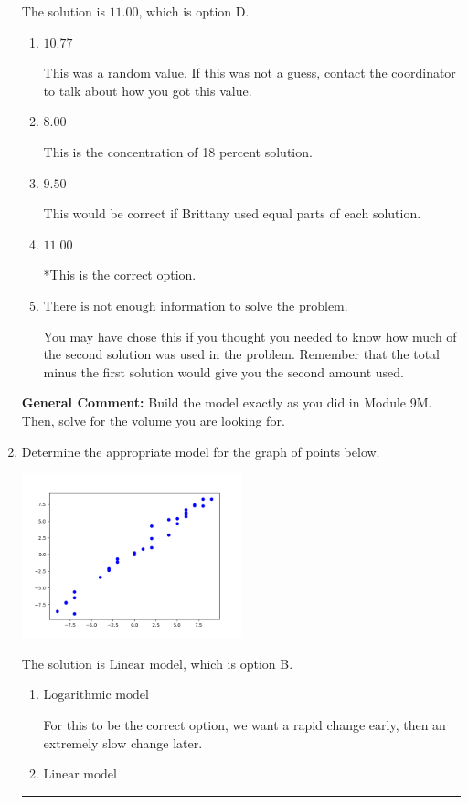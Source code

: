 \documentclass{extbook}[14pt]
\newcommand{\litem}[1]{\item #1

\rule{\textwidth}{0.4pt}}
\begin{document}
\begin{enumerate}
{The solution is \( 11.00 \), which is option D.\begin{enumerate}[label=\Alph*.]
\item \( 10.77 \)

This was a random value. If this was not a guess, contact the coordinator to talk about how you got this value.
\item \( 8.00 \)

This is the concentration of 18 percent solution.
\item \( 9.50 \)

This would be correct if Brittany used equal parts of each solution.
\item \( 11.00 \)

*This is the correct option.
\item \( \text{There is not enough information to solve the problem.} \)

You may have chose this if you thought you needed to know how much of the second solution was used in the problem. Remember that the total minus the first solution would give you the second amount used.
\end{enumerate}

\textbf{General Comment:} Build the model exactly as you did in Module 9M. Then, solve for the volume you are looking for.
}
\litem{
Determine the appropriate model for the graph of points below.

\begin{center}
    \includegraphics[width=0.5\textwidth]{../Figures/identifyModelGraph12CopyC.png}
\end{center}




The solution is \( \text{Linear model} \), which is option B.\begin{enumerate}[label=\Alph*.]
\item \( \text{Logarithmic model} \)

For this to be the correct option, we want a rapid change early, then an extremely slow change later.
\item \( \text{Linear model} \)


\end{enumerate}}
\end{enumerate}
\end{document}
